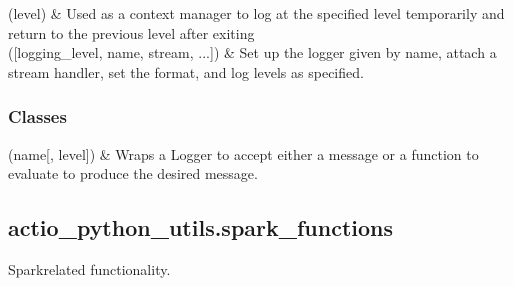 \documentclass[letterpaper,10pt,english]{sphinxmanual}
\begin{document}
\begin{savenotes}\sphinxattablestart
\sphinxthistablewithglobalstyle
\sphinxthistablewithnovlinesstyle
\centering
\begin{tabulary}{\linewidth}[t]{}
\sphinxtoprule
\sphinxtableatstartofbodyhook
\sphinxAtStartPar
{}(level)
&
\sphinxAtStartPar
Used as a context manager to log at the specified level temporarily and return to the previous level after exiting
\\
\sphinxhline
\sphinxAtStartPar
{}({[}logging\_level, name, stream, ...{]})
&
\sphinxAtStartPar
Set up the logger given by name, attach a stream handler, set the format, and log levels as specified.
\\
\sphinxbottomrule
\end{tabulary}
\sphinxtableafterendhook\par
\sphinxattableend\end{savenotes}
\subsubsection*{Classes}


\begin{savenotes}\sphinxattablestart
\sphinxthistablewithglobalstyle
\sphinxthistablewithnovlinesstyle
\centering
\begin{tabulary}{\linewidth}[t]{}
\sphinxtoprule
\sphinxtableatstartofbodyhook
\sphinxAtStartPar
{}(name{[}, level{]})
&
\sphinxAtStartPar
Wraps a Logger to accept either a message or a function to evaluate to produce the desired message.
\\
\sphinxbottomrule
\end{tabulary}
\sphinxtableafterendhook\par
\sphinxattableend\end{savenotes}

\sphinxstepscope


\subsection{actio\_python\_utils.spark\_functions}
\label{\detokenize{_autosummary/actio_python_utils.spark_functions:module-actio_python_utils.spark_functions}}\label{\detokenize{_autosummary/actio_python_utils.spark_functions:actio-python-utils-spark-functions}}\label{\detokenize{_autosummary/actio_python_utils.spark_functions::doc}}
\sphinxAtStartPar
Spark\sphinxhyphen{}related functionality.
\end{document}
